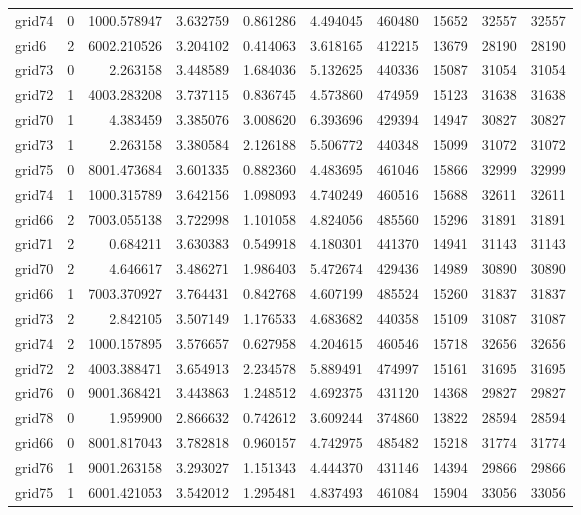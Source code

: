 \begin{longtable}{|l|r|r|r|r|r|r|r|r|r|}
grid74 & 0 & 1000.578947 & 3.632759 & 0.861286 & 4.494045 & 460480 & 15652 & 32557 & 32557 \\
grid6 & 2 & 6002.210526 & 3.204102 & 0.414063 & 3.618165 & 412215 & 13679 & 28190 & 28190 \\
grid73 & 0 & 2.263158 & 3.448589 & 1.684036 & 5.132625 & 440336 & 15087 & 31054 & 31054 \\
grid72 & 1 & 4003.283208 & 3.737115 & 0.836745 & 4.573860 & 474959 & 15123 & 31638 & 31638 \\
grid70 & 1 & 4.383459 & 3.385076 & 3.008620 & 6.393696 & 429394 & 14947 & 30827 & 30827 \\
grid73 & 1 & 2.263158 & 3.380584 & 2.126188 & 5.506772 & 440348 & 15099 & 31072 & 31072 \\
grid75 & 0 & 8001.473684 & 3.601335 & 0.882360 & 4.483695 & 461046 & 15866 & 32999 & 32999 \\
grid74 & 1 & 1000.315789 & 3.642156 & 1.098093 & 4.740249 & 460516 & 15688 & 32611 & 32611 \\
grid66 & 2 & 7003.055138 & 3.722998 & 1.101058 & 4.824056 & 485560 & 15296 & 31891 & 31891 \\
grid71 & 2 & 0.684211 & 3.630383 & 0.549918 & 4.180301 & 441370 & 14941 & 31143 & 31143 \\
grid70 & 2 & 4.646617 & 3.486271 & 1.986403 & 5.472674 & 429436 & 14989 & 30890 & 30890 \\
grid66 & 1 & 7003.370927 & 3.764431 & 0.842768 & 4.607199 & 485524 & 15260 & 31837 & 31837 \\
grid73 & 2 & 2.842105 & 3.507149 & 1.176533 & 4.683682 & 440358 & 15109 & 31087 & 31087 \\
grid74 & 2 & 1000.157895 & 3.576657 & 0.627958 & 4.204615 & 460546 & 15718 & 32656 & 32656 \\
grid72 & 2 & 4003.388471 & 3.654913 & 2.234578 & 5.889491 & 474997 & 15161 & 31695 & 31695 \\
grid76 & 0 & 9001.368421 & 3.443863 & 1.248512 & 4.692375 & 431120 & 14368 & 29827 & 29827 \\
grid78 & 0 & 1.959900 & 2.866632 & 0.742612 & 3.609244 & 374860 & 13822 & 28594 & 28594 \\
grid66 & 0 & 8001.817043 & 3.782818 & 0.960157 & 4.742975 & 485482 & 15218 & 31774 & 31774 \\
grid76 & 1 & 9001.263158 & 3.293027 & 1.151343 & 4.444370 & 431146 & 14394 & 29866 & 29866 \\
grid75 & 1 & 6001.421053 & 3.542012 & 1.295481 & 4.837493 & 461084 & 15904 & 33056 & 33056 \\

\end{longtable}

